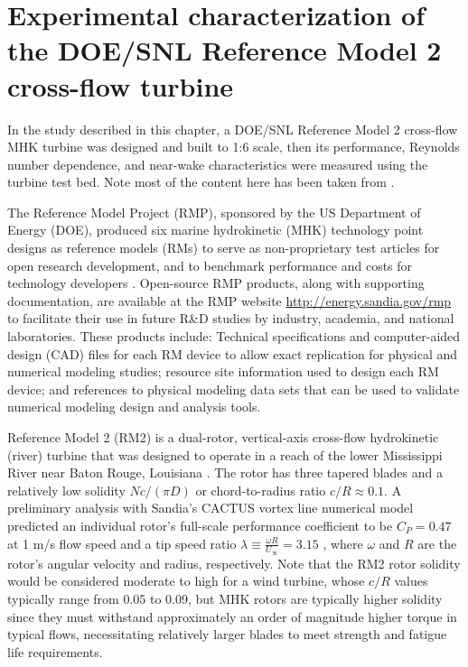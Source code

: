 \chapter{Experimental characterization of the DOE/SNL Reference Model 2
    cross-flow turbine} \label{chap:RM2}

In the study described in this chapter, a DOE/SNL Reference Model 2 cross-flow
MHK turbine was designed and built to 1:6 scale, then its performance, Reynolds
number dependence, and near-wake characteristics were measured using the turbine
test bed. Note most of the content here has been taken from
\cite{Bachant2016-RM2-paper}.

The Reference Model Project (RMP), sponsored by the US Department of Energy
(DOE), produced six marine hydrokinetic (MHK) technology point designs as
reference models (RMs) to serve as non-proprietary test articles for open
research development, and to benchmark performance and costs for technology
developers \cite{Neary2014, Neary2014a}. Open-source RMP products, along with
supporting documentation, are available at the RMP website
\url{http://energy.sandia.gov/rmp} to facilitate their use in future R\&D
studies by industry, academia, and national laboratories. These products
include: Technical specifications and computer-aided design (CAD) files for each
RM device to allow exact replication for physical and numerical modeling
studies; resource site information used to design each RM device; and references
to physical modeling data sets that can be used to validate numerical modeling
design and analysis tools.

Reference Model 2 (RM2) is a dual-rotor, vertical-axis cross-flow hydrokinetic
(river) turbine that was designed to operate in a reach of the lower Mississippi
River near Baton Rouge, Louisiana \cite{Barone2011, Neary2011}. The rotor has
three tapered blades and a relatively low solidity $Nc/(\pi D)$ or
chord-to-radius ratio $c/R \approx 0.1$. A preliminary analysis with Sandia's
CACTUS vortex line numerical model \cite{Murray2011} predicted an individual
rotor's full-scale performance coefficient to be $C_P=0.47$ at 1 m/s flow speed
and a tip speed ratio $\lambda \equiv \frac{\omega R}{U_\infty} = 3.15$
\cite{Barone2011}, where $\omega$ and $R$ are the rotor's angular velocity and
radius, respectively. Note that the RM2 rotor solidity would be considered
moderate to high for a wind turbine, whose $c/R$ values typically range from
0.05 to 0.09, but MHK rotors are typically higher solidity since they must
withstand approximately an order of magnitude higher torque in typical flows,
necessitating relatively larger blades to meet strength and fatigue life
requirements.

